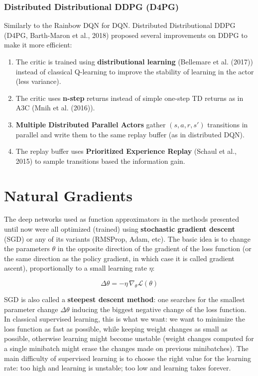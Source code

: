 \documentclass[
  letterpaper,
  DIV=11,
  numbers=noendperiod]{scrreprt}
\begin{document}
\hypertarget{distributed-distributional-ddpg-d4pg}{%
\subsection{Distributed Distributional DDPG
(D4PG)}\label{distributed-distributional-ddpg-d4pg}}

Similarly to the Rainbow DQN for DQN. Distributed Distributional DDPG
(D4PG, Barth-Maron et al., 2018) proposed several improvements on DDPG
to make it more efficient:

\begin{enumerate}
\def\labelenumi{\arabic{enumi}.}
\item
  The critic is trained using \textbf{distributional learning}
  (Bellemare et al. (2017)) instead of classical Q-learning to improve
  the stability of learning in the actor (less variance).
\item
  The critic uses \textbf{n-step} returns instead of simple one-step TD
  returns as in A3C (Mnih et al. (2016)).
\item
  \textbf{Multiple Distributed Parallel Actors} gather \((s, a, r, s')\)
  transitions in parallel and write them to the same replay buffer (as
  in distributed DQN).
\item
  The replay buffer uses \textbf{Prioritized Experience Replay} (Schaul
  et al., 2015) to sample transitions based the information gain.
\end{enumerate}


\hypertarget{natural-gradients}{%
\chapter{Natural Gradients}\label{natural-gradients}}

The deep networks used as function approximators in the methods
presented until now were all optimized (trained) using
\textbf{stochastic gradient descent} (SGD) or any of its variants
(RMSProp, Adam, etc). The basic idea is to change the parameters
\(\theta\) in the opposite direction of the gradient of the loss
function (or the same direction as the policy gradient, in which case it
is called gradient ascent), proportionally to a small learning rate
\(\eta\):

\[
    \Delta \theta = - \eta \, \nabla_\theta \mathcal{L}(\theta)
\]

SGD is also called a \textbf{steepest descent method}: one searches for
the smallest parameter change \(\Delta \theta\) inducing the biggest
negative change of the loss function. In classical supervised learning,
this is what we want: we want to minimize the loss function as fast as
possible, while keeping weight changes as small as possible, otherwise
learning might become unstable (weight changes computed for a single
minibatch might erase the changes made on previous minibatches). The
main difficulty of supervised learning is to choose the right value for
the learning rate: too high and learning is unstable; too low and
learning takes forever.
\end{document}
